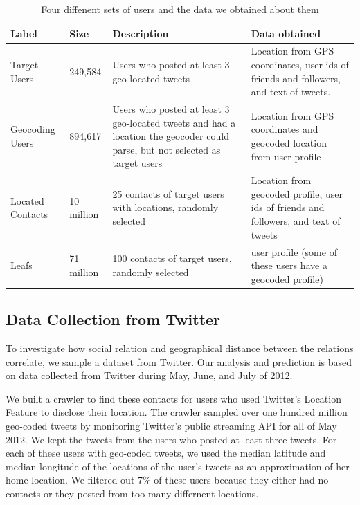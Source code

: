 \documentclass[letterpaper]{article}
\begin{document}
\begin{table}[tbh]
\scriptsize
\centering
\begin{tabular}{l l p{4cm} p{6cm}}
    Label & Size & Description & Data obtained \\
    \hline
    Target Users & 249,584 & Users who posted at least 3 geo-located tweets &
    Location from GPS coordinates, user ids of friends and followers,
    and text of tweets. \\
    Geocoding Users & 894,617 & Users who posted at least 3 geo-located tweets
    and had a location the geocoder could parse, but not selected as target users &
    Location from GPS coordinates and geocoded location from user profile \\
    Located Contacts & 10 million & 25 contacts of target users with locations, randomly selected &
    Location from geocoded profile, user ids of friends and followers, and text of tweets \\
    Leafs & 71 million & 100 contacts of target users, randomly selected &
    user profile (some of these users have a geocoded profile)\\
\end{tabular}
\caption{Four diffenent sets of users and the data we obtained about them}
\label{tab:datasets}
\end{table}

\subsection{Data Collection from Twitter}
To investigate how social relation and geographical distance between the
relations correlate, we sample a dataset from Twitter.
%
Our analysis and prediction is based on data collected from Twitter during
May, June, and July of 2012.

We built a crawler to find these contacts for users who used Twitter's Location
Feature to disclose their location.
%
The crawler sampled over one hundred million geo-coded tweets by monitoring
Twitter's public streaming API for all of May 2012.
We kept the tweets from the users who posted at least three tweets.
%
For each of these users with geo-coded tweets, we used the median latitude and
median longitude of the locations of the user's tweets as an approximation of
her home location.
%
We filtered out 7\% of these users because they either had no contacts or they
posted from too many differnent locations.
\end{document}

